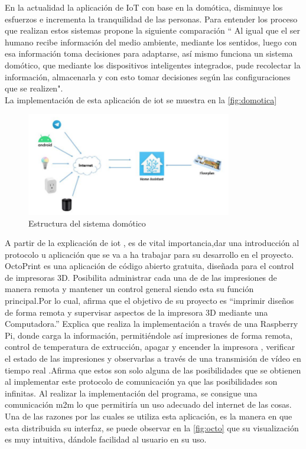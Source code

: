 En la actualidad la aplicación de IoT con base en la domótica, disminuye los esfuerzos e incrementa la tranquilidad de las personas. Para entender los proceso que realizan estos sistemas \citep{fernandez} propone la siguiente comparación “ Al igual que el ser humano recibe información del medio ambiente, mediante
los sentidos, luego con esa información toma decisiones para adaptarse, así mismo funciona un sistema domótico, que mediante los dispositivos inteligentes integrados, pude recolectar la información, almacenarla y con esto tomar decisiones según las configuraciones que se realizen".\\

La implementación de esta aplicación de \acrshort{iot} se muestra en la \autoref{fig:domotica}

\begin{figure}[H]
    \centering
    \includegraphics[width=0.8\textwidth]{Figs/iot.PNG}
    \caption{Estructura del sistema domótico \citep{tinoco} }
     \label{fig:domotica}
\end{figure}


A partir de la explicación de \acrshort{iot} , es de vital importancia,dar una introducción al protocolo u aplicación que se va a ha trabajar para su desarrollo en el proyecto.\\

OctoPrint es una aplicación de código abierto gratuita, diseñada para el control de impresoras 3D. Posibilita administrar cada una de de las impresiones de manera remota y mantener un control general siendo esta su función principal.Por lo cual, \citep{mp} afirma que el objetivo de su proyecto es “imprimir diseños
de forma remota y supervisar aspectos de la impresora 3D mediante una
Computadora.'' Explica que realiza la implementación a través de una Raspberry Pi, donde carga la información, permitiéndole así impresiones de forma remota, control de temperatura de extrucción, apagar y encender la impresora , verificar el estado de las impresiones y observarlas a través de una transmisión de vídeo en tiempo real .Afirma que estos son solo alguna de las posibilidades que se obtienen al implementar este protocolo de comunicación ya que las posibilidades son infinitas.  Al realizar la implementación del programa, se consigue una comunicación \acrshort{m2m} lo que permitiría un uso adecuado del internet de las cosas. Una de las razones por las cuales se utiliza esta aplicación, es la manera en que esta distribuida su interfaz, se puede observar en la \autoref{fig:octo} que su visualización es muy intuitiva, dándole facilidad al usuario en su uso.


